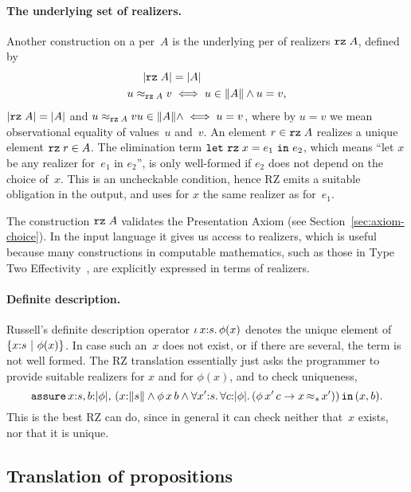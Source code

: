 \paragraph{The underlying set of realizers.}
%
Another construction on a per~$A$ is the underlying
per of realizers $\texttt{rz}\;A$, defined by
%
\iflong
\begin{align*}
  |\texttt{rz}\;A| &= |A| \\
  u \approx_{\texttt{rz}\;A} v &\iff u \in \|A\| \land u = v,
\end{align*}
%
\else  %
$|\texttt{rz}\;A| = |A|$ and 
$u \approx_{\texttt{rz}\;A} v u \in \|A\| \land \iff u = v$, 
\fi %
%
where by $u = v$ we mean observational equality of values~$u$ and~$v$.
%
An element $r \in \texttt{rz}\;A$ realizes a unique element $\texttt{rz}\;r \in A$.
The elimination term $\texttt{let}\ \texttt{rz}\;x\;{=}\;e_1\ \texttt{in}\ e_2$, which means ``let $x$ be
any realizer for~$e_1$ in $e_2$'', is only well-formed if $e_2$ does
not depend on the choice of~$x$. This is an uncheckable condition,
hence RZ emits a suitable obligation in the output, and uses for $x$
the same realizer as for~$e_1$.

The construction $\texttt{rz}\;A$ validates the Presentation Axiom (see
Section~\ref{sec:axiom-choice}). In the input language it gives us
access to realizers, which is useful because many constructions in
computable mathematics, such as those in Type Two
Effectivity~\cite{Wei00}, are explicitly expressed in terms of
realizers.

\iflong
\paragraph{Definite description.}
%
Russell's definite description operator $\iota\,x{:}s{.}\, \phi(x)$ denotes
the unique element of $\{x{:}s\ |\ \phi(x)\}$. In case such an~$x$
does not exist, or if there are several, the term is not well formed.
The RZ translation essentially just asks the programmer to provide
suitable realizers for $x$ and for $\phi(x)$, and to check uniqueness,
%
\begin{equation*}
  \ooblig{x{:}s,b}{\typeOf{\phi}}{
    (\ototal{x}{s} \land \oapp{\oapp{\phi}{x}}{b} \land
    \oforall{x'}{s}{
      \oforall{c}{\typeOf{\phi}}{
        (\oimply{\oapp{\oapp{\phi}{x'}}{c}}{\oper{s}{x}{x'}})
      }
    })
    }{(x,b)}.
\end{equation*}
%
This is the best RZ can do, since in general it can check neither
that~$x$ exists, nor that it is unique.
\fi

\subsection{Translation of propositions}
\label{sec:transl-prop}

